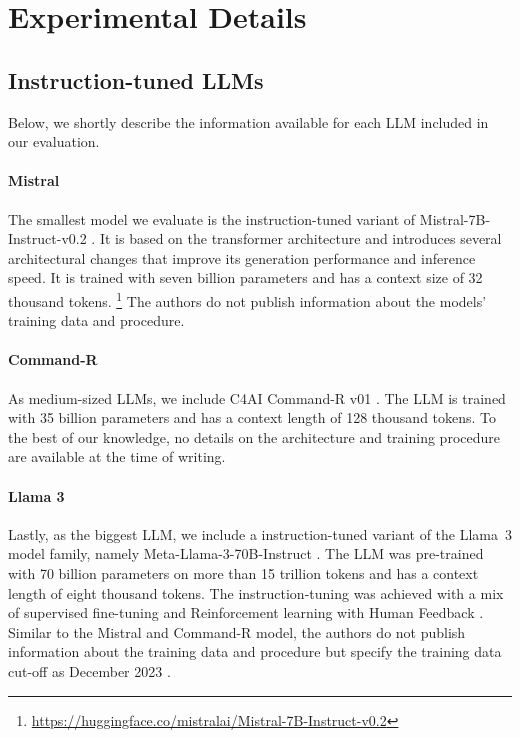 \section{Experimental Details}
\label{sec:appendix-experimental-details}



\subsection{Instruction-tuned LLMs}
Below, we shortly describe the information available for each LLM included in our evaluation.


\paragraph{Mistral}
The smallest model we evaluate is the instruction-tuned variant of
Mistral-7B-Instruct-v0.2 \cite{jiang2023}. It is based on the transformer architecture and introduces several architectural changes that improve its generation performance and inference speed. It is trained with seven billion parameters and has a context size of 32 thousand tokens.%
\footnote{\url{https://huggingface.co/mistralai/Mistral-7B-Instruct-v0.2}}
The authors do not publish information about the models' training data and procedure.


\paragraph{Command-R}
As medium-sized LLMs, we include C4AI Command-R v01 \cite{cohereforai2024}. The LLM is trained with 35 billion parameters and has a context length of 128 thousand tokens. To the best of our knowledge, no details on the architecture and training procedure are available at the time of writing.


\paragraph{Llama 3}
Lastly, as the biggest LLM, we include a instruction-tuned variant of the Llama~3 model family, namely Meta-Llama-3-70B-Instruct \cite{dubey2024}. The LLM was pre-trained with 70 billion parameters on more than 15 trillion tokens and has a context length of eight thousand tokens. The instruction-tuning was achieved with a mix of supervised fine-tuning and Reinforcement learning with Human Feedback \cite{dubey2024}. Similar to the Mistral and Command-R model, the authors do not publish information about the training data and procedure but specify the training data cut-off as December 2023 \cite{dubey2024}.


